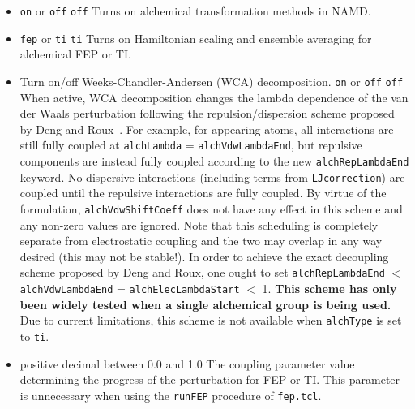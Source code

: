 \begin{itemize}
\item
{} {{\tt on} or {\tt off}} {{\tt off}} {Turns on alchemical transformation methods in NAMD.}

\item
{} {{\tt fep} or {\tt ti}} {{\tt ti}} 
{Turns on Hamiltonian scaling and ensemble averaging for alchemical FEP or TI.}

\item
{}
{Turn on/off Weeks-Chandler-Andersen (WCA) decomposition.}
{{\tt on} or {\tt off}}
{{\tt off}}
{
When active, WCA decomposition changes the lambda dependence of the van der
  Waals perturbation following the repulsion/dispersion scheme proposed by
  Deng and Roux~\cite{Deng2004}.
For example, for appearing atoms, all interactions are still fully coupled at
  {\tt alchLambda} = {\tt alchVdwLambdaEnd}, but repulsive components are
  instead fully coupled according to the new {\tt alchRepLambdaEnd} keyword.
No dispersive interactions (including terms from {\tt LJcorrection}) are
  coupled until the repulsive interactions are fully coupled.
By virtue of the formulation, {\tt alchVdwShiftCoeff} does not have any effect
  in this scheme and any non-zero values are ignored.
Note that this scheduling is completely separate from electrostatic coupling
  and the two may overlap in any way desired (this may not be stable!).
In order to achieve the exact decoupling scheme proposed by Deng and Roux,
  one ought to set {\tt alchRepLambdaEnd} $<$ {\tt alchVdwLambdaEnd} =
  {\tt alchElecLambdaStart} $<$ 1.
\textbf{
This scheme has only been widely tested when a single alchemical group is
  being used.
}
Due to current limitations, this scheme is not available when {\tt alchType}
  is set to {\tt ti}.
}

\item
{} {positive
decimal between 0.0 and 1.0} {The coupling parameter value determining the
progress of the perturbation for FEP or TI.
This parameter is unnecessary when using the \texttt{runFEP} procedure of
\texttt{fep.tcl}.}


\end{itemize}
